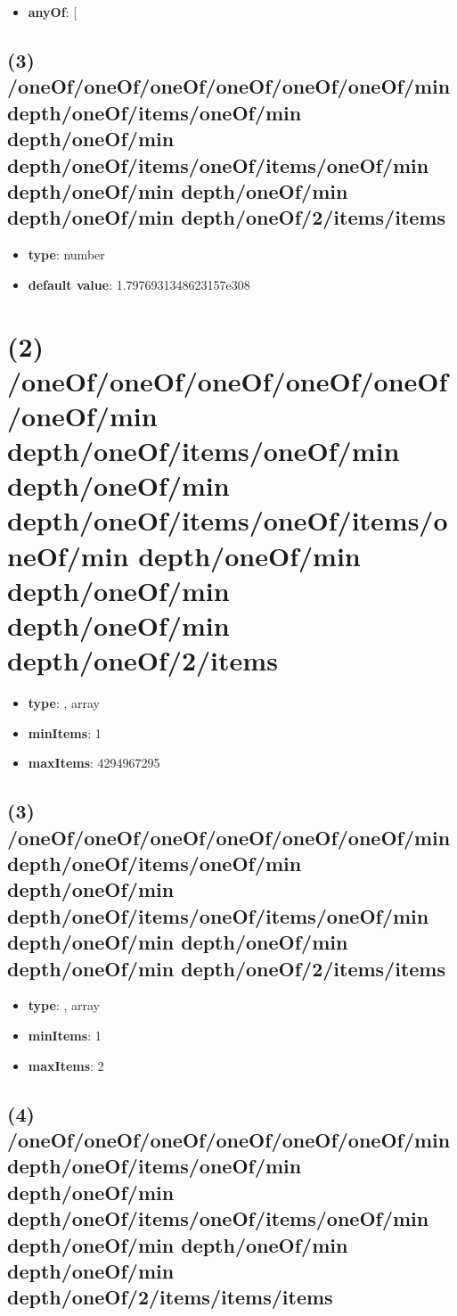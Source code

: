 \begin{itemize}[leftmargin=3em]\item {\bf anyOf}: [\end{itemize}\subsection{(3) /oneOf/oneOf/oneOf/oneOf/oneOf/oneOf/min depth/oneOf/items/oneOf/min depth/oneOf/min depth/oneOf/items/oneOf/items/oneOf/min depth/oneOf/min depth/oneOf/min depth/oneOf/min depth/oneOf/2/items/items}
\begin{itemize}[leftmargin=3em]\item {\bf type}: number\item {\bf default value}: 1.7976931348623157e308
\end{itemize}\section{(2) /oneOf/oneOf/oneOf/oneOf/oneOf/oneOf/min depth/oneOf/items/oneOf/min depth/oneOf/min depth/oneOf/items/oneOf/items/oneOf/min depth/oneOf/min depth/oneOf/min depth/oneOf/min depth/oneOf/2/items}
\begin{itemize}[leftmargin=2em]\item {\bf type}: , array\item {\bf minItems}: 1
\item {\bf maxItems}: 4294967295
\end{itemize}\subsection{(3) /oneOf/oneOf/oneOf/oneOf/oneOf/oneOf/min depth/oneOf/items/oneOf/min depth/oneOf/min depth/oneOf/items/oneOf/items/oneOf/min depth/oneOf/min depth/oneOf/min depth/oneOf/min depth/oneOf/2/items/items}
\begin{itemize}[leftmargin=3em]\item {\bf type}: , array\item {\bf minItems}: 1
\item {\bf maxItems}: 2
\end{itemize}\subsection{(4) /oneOf/oneOf/oneOf/oneOf/oneOf/oneOf/min depth/oneOf/items/oneOf/min depth/oneOf/min depth/oneOf/items/oneOf/items/oneOf/min depth/oneOf/min depth/oneOf/min depth/oneOf/min depth/oneOf/2/items/items/items}
